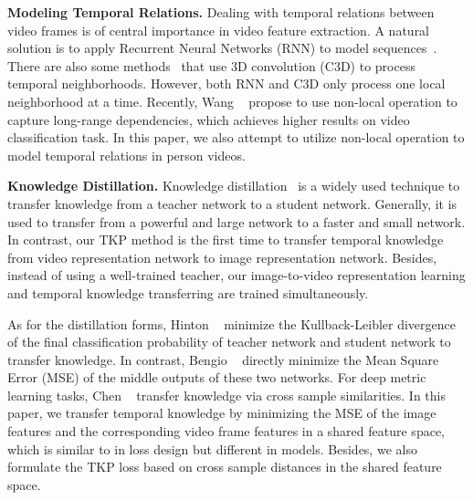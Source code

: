 \documentclass[10pt,twocolumn,letterpaper]{article}
\begin{document}
\vspace{5pt}
\noindent
{\bf Modeling Temporal Relations.}
Dealing with temporal relations between video frames is of central importance in video feature extraction.
A natural solution is to apply Recurrent Neural Networks (RNN) to model sequences~\cite{Chung2017A, Mclaughlin2016Recurrent, Ng2015Beyond}.
There are also some methods~\cite{Feichtenhofer2017Spatiotemporal, Shuiwang20103D, Du2015Learning} that use 3D convolution (C3D) to process temporal neighborhoods.
However, both RNN and C3D only process one local neighborhood at a time.
Recently, Wang \etal~\cite{Wang2018Non} propose to use non-local operation to capture long-range dependencies, which achieves higher results on video classification task.
In this paper, we also attempt to utilize non-local operation to model temporal relations in person videos.

\vspace{5pt}
\noindent
{\bf Knowledge Distillation.}
Knowledge distillation~\cite{Cristian2006Model,Hinton2015Distilling,Romero2015FitNets,Chen2018DarkRank} is a widely used technique to transfer knowledge from a teacher network to a student network.
Generally, it is used to transfer from a powerful and large network to a faster and small network.
In contrast, our TKP method is the first time to transfer temporal knowledge from video representation network to image representation network.
Besides, instead of using a well-trained teacher, our image-to-video representation learning and temporal knowledge transferring are trained simultaneously.

As for the distillation forms, Hinton \etal~\cite{Hinton2015Distilling,Zhang2018Deep} minimize the Kullback-Leibler divergence of the final classification probability of teacher network and student network to transfer knowledge.
In contrast, Bengio \etal~\cite{Romero2015FitNets} directly minimize the Mean Square Error (MSE) of the middle outputs of these two networks.
For deep metric learning tasks, Chen \etal~\cite{Chen2018DarkRank, Zhang2017AlignedReID} transfer knowledge via cross sample similarities.
In this paper, we transfer temporal knowledge by minimizing the MSE of the image features and the corresponding video frame features in a shared feature space, which is  similar to \cite{Romero2015FitNets} in loss design but different in models. Besides, we also formulate the TKP loss based on cross sample distances in the shared feature space.
\end{document}

